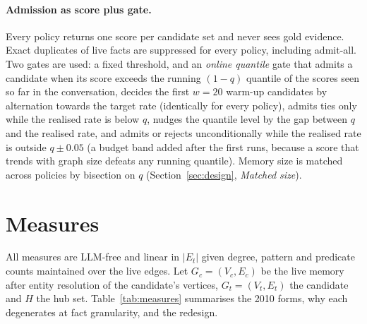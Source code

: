\documentclass{ceurart}
\newcommand{\Gc}{G_c}
\newcommand{\Gt}{G_t}
\newcommand{\Ec}{E_c}
\newcommand{\Et}{E_t}
\newcommand{\Vc}{V_c}
\newcommand{\Vt}{V_t}
\newcommand{\Hub}{H}
\begin{document}
\paragraph{Admission as score plus gate.} Every policy returns one score per candidate set and never sees gold evidence. Exact duplicates of live facts are suppressed for every policy, including admit-all. Two gates are used: a fixed threshold, and an \emph{online quantile} gate that admits a candidate when its score exceeds the running $(1-q)$ quantile of the scores seen so far in the conversation, decides the first $w=20$ warm-up candidates by alternation towards the target rate (identically for every policy), admits ties only while the realised rate is below $q$, nudges the quantile level by the gap between $q$ and the realised rate, and admits or rejects unconditionally while the realised rate is outside $q\pm0.05$ (a budget band added after the first runs, because a score that trends with graph size defeats any running quantile). Memory size is matched across policies by bisection on $q$ (Section~\ref{sec:design}, \emph{Matched size}).

\section{Measures}
\label{sec:measures}

All measures are LLM-free and linear in $|\Et|$ given degree, pattern and predicate counts maintained over the live edges. Let $\Gc=(\Vc,\Ec)$ be the live memory after entity resolution of the candidate's vertices, $\Gt=(\Vt,\Et)$ the candidate and $\Hub$ the hub set. Table~\ref{tab:measures} summarises the 2010 forms, why each degenerates at fact granularity, and the redesign.
\end{document}
